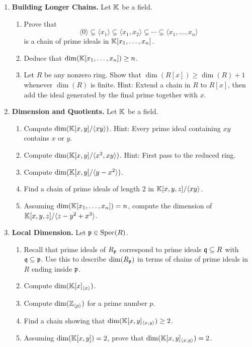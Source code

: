 \documentclass[12pt,reqno]{amsart}
\begin{document}
\begin{enumerate}[leftmargin=*, resume=problems]
\item \textbf{Building Longer Chains.} Let $\mathbb{K}$ be a field.
\begin{enumerate}
    \item Prove that
    \[
    \langle 0\rangle
    \subsetneq
    \langle x_1\rangle
    \subsetneq
    \langle x_1,x_2\rangle
    \subsetneq
    \cdots
    \subsetneq
    \langle x_1,\ldots,x_n\rangle
    \]
    is a chain of prime ideals in $\mathbb{K}[x_1,\ldots,x_n]$.
    \item Deduce that $\dim(\mathbb{K}[x_1,\ldots,x_n])\geq n$.
    \item Let $R$ be any nonzero ring. Show that $\dim(R[x])\geq \dim(R)+1$ whenever $\dim(R)$ is finite. Hint: Extend a chain in $R$ to $R[x]$, then add the ideal generated by the final prime together with $x$.
\end{enumerate}

\item \textbf{Dimension and Quotients.} Let $\mathbb{K}$ be a field.
\begin{enumerate}
    \item Compute $\dim(\mathbb{K}[x,y]/\langle xy\rangle)$. Hint: Every prime ideal containing $xy$ contains $x$ or $y$.
    \item Compute $\dim(\mathbb{K}[x,y]/\langle x^2,xy\rangle)$. Hint: First pass to the reduced ring.
    \item Compute $\dim(\mathbb{K}[x,y]/\langle y-x^2\rangle)$.
    \item Find a chain of prime ideals of length $2$ in $\mathbb{K}[x,y,z]/\langle xy\rangle$.
    \item Assuming $\dim(\mathbb{K}[x_1,\ldots,x_n])=n$, compute the dimension of $\mathbb{K}[x,y,z]/\langle z-y^2+x^3\rangle$.
\end{enumerate}

\item \textbf{Local Dimension.} Let $\mathfrak{p}\in\operatorname{Spec}(R)$.
\begin{enumerate}
    \item Recall that prime ideals of $R_{\mathfrak{p}}$ correspond to prime ideals $\mathfrak{q}\subseteq R$ with $\mathfrak{q}\subseteq \mathfrak{p}$. Use this to describe $\dim(R_{\mathfrak{p}})$ in terms of chains of prime ideals in $R$ ending inside $\mathfrak{p}$.
    \item Compute $\dim(\mathbb{K}[x]_{\langle x\rangle})$.
    \item Compute $\dim(\mathbb{Z}_{\langle p\rangle})$ for a prime number $p$.
    \item Find a chain showing that $\dim(\mathbb{K}[x,y]_{\langle x,y\rangle})\geq 2$.
    \item Assuming $\dim(\mathbb{K}[x,y])=2$, prove that $\dim(\mathbb{K}[x,y]_{\langle x,y\rangle})=2$.
\end{enumerate}

\end{enumerate}
\end{document}
